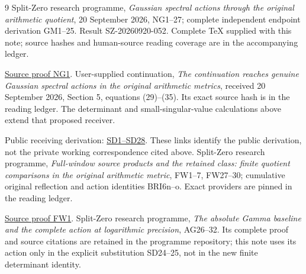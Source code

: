 \documentclass[11pt]{article}
\begin{document}
\begin{thebibliography}{9}
 Split-Zero research programme, \emph{Gaussian spectral
actions through the original arithmetic quotient}, 20 September 2026,
NG1--27; complete independent endpoint derivation GM1--25. Result
SZ-20260920-052. Complete TeX supplied with this note; source hashes and
human-source reading coverage are in the accompanying ledger.

\href{https://github.com/KokunoYumeto/zeta-function-research-reader/blob/5992ad50c0f2a06921f1fcaded7b4e38097c0739/workbenches/splitzero-tandem/continuations/20260920-original-kernel-mixed-determinants/providers/GAUSSIAN_ARITHMETIC_RETURN.tex\#L31}{Source proof NG1}.
 User-supplied continuation, \emph{The continuation
reaches genuine Gaussian spectral actions in the original arithmetic
metrics}, received 20 September 2026, Section 5, equations (29)--(35).
Its exact source hash is in the reading ledger. The determinant and
small-singular-value calculations above extend that proposed receiver.

Public receiving derivation: \href{https://github.com/KokunoYumeto/zeta-function-research-reader/blob/689a8f87e9c12b7a99b01b3123438c6751ee608f/workbenches/splitzero-tandem/continuations/20260920-original-spectral-determinant/ORIGINAL_SPECTRAL_DETERMINANT.tex\#L34}{SD1--SD28}. These links identify the public derivation, not the private working correspondence cited above.
 Split-Zero research programme, \emph{Full-window source
products and the retained class: finite quotient comparisons in the
original arithmetic metric}, FW1--7, FW27--30; cumulative original
reflection and action identities BRI6n--o. Exact providers are pinned
in the reading ledger.

\href{https://github.com/KokunoYumeto/zeta-function-research-reader/blob/5992ad50c0f2a06921f1fcaded7b4e38097c0739/workbenches/splitzero-tandem/continuations/20260920-original-kernel-mixed-determinants/providers/FULL_WINDOW_SOURCE_PRODUCTS.tex\#L28}{Source proof FW1}.
 Split-Zero research programme, \emph{The absolute Gamma
baseline and the complete action at logarithmic precision}, AG26--32.
Its complete proof and source citations are retained in the programme
repository; this note uses its action only in the explicit substitution
SD24--25, not in the new finite determinant identity.


\end{thebibliography}
\end{document}
